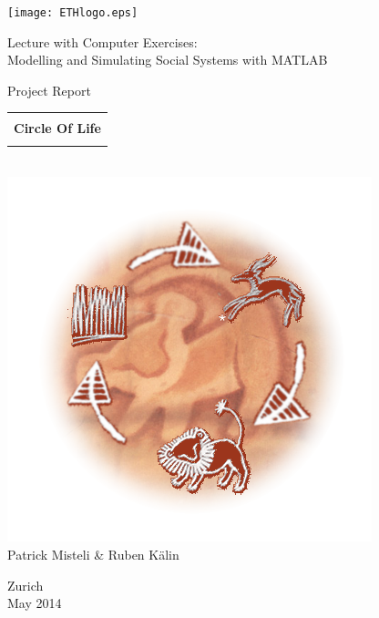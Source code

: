 
\thispagestyle{empty}

\begin{center}
\texttt{[image: ETHlogo.eps]}

\bigskip


\bigskip


\bigskip


\LARGE{ 	Lecture with Computer Exercises:\\ }
\LARGE{ Modelling and Simulating Social Systems with MATLAB\\}

\bigskip

\bigskip

\small{Project Report}\\

\bigskip

\bigskip

\bigskip

\bigskip


\begin{tabular}{|c|}
\hline
\\
\textbf{\LARGE{Circle Of Life}}\\
\\
\hline
\end{tabular}
\bigskip
\\
\includegraphics[scale=0.69]{images/circleEdited.png}\label{fig:circle}\\
\bigskip
\LARGE{Patrick Misteli \& Ruben K{\"a}lin}

\bigskip

\bigskip

\bigskip

\bigskip

\bigskip

\bigskip

Zurich\\
May 2014\\

\end{center}


